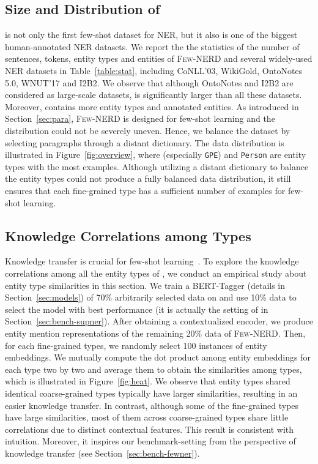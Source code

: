 \documentclass[11pt,a4paper, dvipsnames]{article}
\begin{document}
\subsection{Size and Distribution of }
\label{sec:datasize}
\label{sec:dist}
 is not only the first few-shot dataset for NER, but it also is one of the biggest human-annotated NER datasets. We report the the statistics of the number of sentences, tokens, entity types and entities of \textsc{Few-NERD} and several widely-used NER datasets in Table~\ref{table:stat}, including CoNLL'03, WikiGold, OntoNotes 5.0, WNUT'17 and I2B2. We observe that although OntoNotes and I2B2 are considered as large-scale datasets,  is significantly larger than all these datasets. Moreover,  contains more entity types and annotated entities.
As introduced in Section~\ref{sec:para}, \textsc{Few-NERD} is designed for few-shot learning and the distribution could not be severely uneven. Hence, we balance the dataset by selecting paragraphs through a distant dictionary. 
The data distribution is illustrated in Figure~\ref{fig:overview}, where  (especially \texttt{GPE}) and \texttt{Person} are entity types with the most examples.
Although utilizing a distant dictionary to balance the entity types could not produce a fully balanced data distribution, it still ensures that each fine-grained type has a sufficient number of examples for few-shot learning.






\subsection{Knowledge Correlations among Types}
\label{sec:sim}

Knowledge transfer is crucial for few-shot learning~\cite{li2019large}. To explore the knowledge correlations among all the entity types of , we conduct an empirical study about entity type similarities in this section.
We train a BERT-Tagger (details in Section~\ref{sec:models}) of 70\% arbitrarily selected data on  and use 10\% data to select the model with best performance (it is actually the setting of  in Section~\ref{sec:bench-supner}). After obtaining a contextualized encoder, we produce entity mention representations of the remaining 20\% data of \textsc{Few-NERD}. Then, for each fine-grained types, we randomly select 100 instances of entity embeddings. We mutually compute the dot product among entity embeddings for each type two by two and average them to obtain the similarities among types, which is illustrated in Figure~\ref{fig:heat}. We observe that entity types shared identical coarse-grained types typically have larger similarities, resulting in an easier knowledge transfer. In contrast, although some of the fine-grained types have large similarities, most of them across coarse-grained types share little correlations due to distinct contextual features. This result is consistent with intuition. Moreover, it inspires our benchmark-setting from the perspective of knowledge transfer (see Section~\ref{sec:bench-fewner}).
\end{document}
